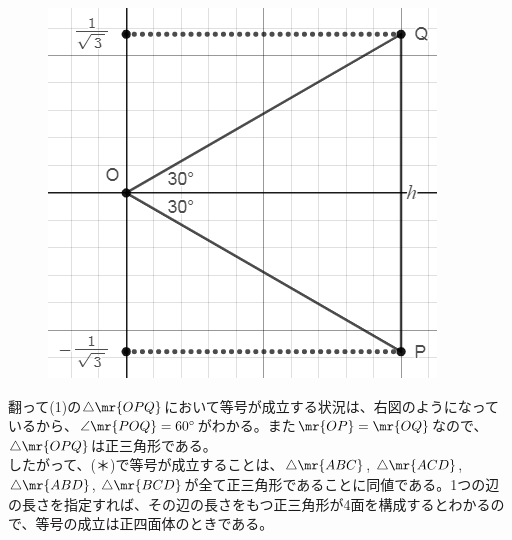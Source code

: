 \begin{figure}
 \includegraphics[width=\linewidth]{../problems/Q_130/A_130_2.png}
\end{figure}
翻って(1)の$\triangle\mr{OPQ}$において等号が成立する状況は、右図のようになっているから、$\angle\mr{POQ}=60^\circ$がわかる。また$\mr{OP}=\mr{OQ}$なので、$\triangle\mr{OPQ}$は正三角形である。\\
したがって、(＊)で等号が成立することは、$\triangle\mr{ABC}$, $\triangle\mr{ACD}$, $\triangle\mr{ABD}$, $\triangle\mr{BCD}$が全て正三角形であることに同値である。1つの辺の長さを指定すれば、その辺の長さをもつ正三角形が4面を構成するとわかるので、等号の成立は正四面体のときである。